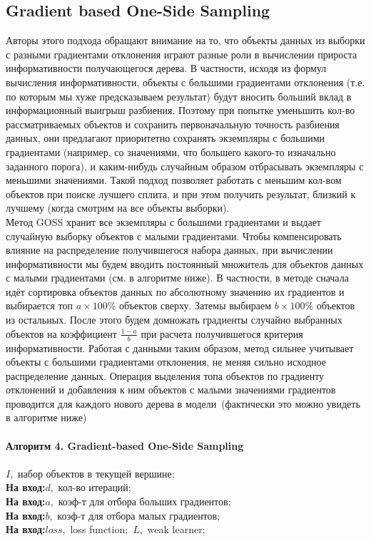 \documentclass[12pt,fleqn]{article}
\begin{document}
\subsection{Gradient based One-Side Sampling}
Авторы этого подхода обращают внимание на то, что объекты данных из выборки с разными градиентами отклонения играют разные роли в вычислении прироста информативности получающегося дерева. В частности, исходя из формул вычисления информативности, объекты с большими градиентами отклонения (т.е. по которым мы хуже предсказываем результат) будут вносить больший вклад в информационный выигрыш разбиения. Поэтому при попытке уменьшить кол-во рассматриваемых объектов и сохранить первоначальную точность разбиения данных, они предлагают приоритетно сохранять экземпляры с большими градиентами (например, со значениями, что большего какого-то изначально заданного порога), и каким-нибудь случайным образом отбрасывать экземпляры с меньшими значениями. Такой подход позволяет работать с меньшим кол-вом объектов при поиске лучшего сплита, и при этом получить результат, близкий к лучшему (когда смотрим на все объекты выборки).\\

Метод GOSS хранит все экземпляры с большими градиентами и выдает случайную выборку объектов с малыми градиентами. Чтобы компенсировать влияние на распределение получившегося набора данных, при вычислении информативности мы будем вводить постоянный множитель для объектов данных с малыми градиентами (см. в алгоритме ниже). В частности, в методе сначала идёт сортировка объектов данных по абсолютному значению их градиентов и выбирается топ $a \times 100\%$ объектов сверху. Затемы выбираем $b \times 100\%$ объектов из остальных. После этого будем домножать градиенты случайно выбранных объектов на коэффициент $\frac{1 - a}{b}$ при расчета получившегося критерия информативности. Работая с данными таким образом, метод сильнее учитывает объекты с большими градиентами отклонения, не меняя сильно исходное распределение данных. Операция выделения топа объектов по градиенту отклонений и добавления к ним объектов с малыми значениями градиентов проводится для каждого нового дерева в модели~(фактически это можно увидеть в алгоритме ниже)
\vspace{5pt}
\noindent
\hline\\
\hline\\ \vspace{5pt}
\textbf{Алгоритм 4. Gradient-based One-Side Sampling}\\
\hline\\ \vspace{10pt}
 $I$,~набор объектов в текущей вершине;\\
{\bf На вход:}$d$,~кол-во итераций;\\
{\bf На вход:}$a$,~коэф-т для отбора больших градиентов;\\
{\bf На вход:}$b$,~коэф-т для отбора малых градиентов;\\
{\bf На вход:}$loss$,~loss function;~$L$,~weak learner;\\
\end{document}

